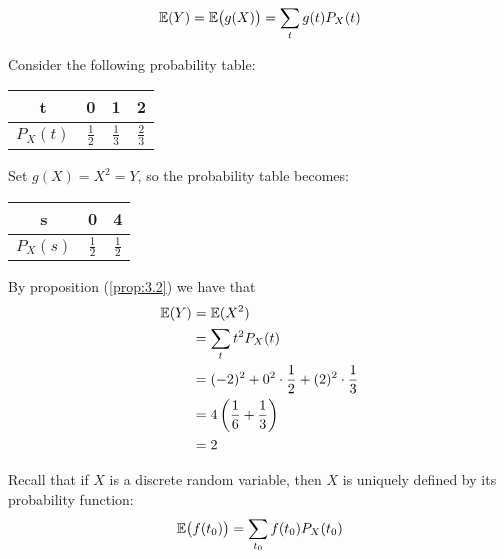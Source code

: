 \documentclass{article}
\begin{document}
	\begin{cor}
		$$ \mathbb{E}(Y) = \mathbb{E} \big( g(X) \big) = \sum_t g(t) P_X (t)$$
	\end{cor}
	\begin{exmp}
		Consider the following probability table:
		\begin{table}[h]
			\begin{tabular}{c|c|c|c}
				t & 0        & 1 & 2        \\ \hline
				$P_X(t)$ & $\frac12$ & $\frac13$ & $\frac23$
			\end{tabular}
		\end{table}
	\end{exmp}
	Set $g(X) = X^2 = Y$, so the probability table becomes:
	\begin{table}[h]
		\begin{tabular}{c|c|c}
			s & 0        & 4        \\ \hline
			$P_X(s)$ & $\frac12$ & $\frac12$
		\end{tabular}
	\end{table}
	By proposition (\ref{prop:3.2}) we have that
	\begin{align*}
		\mathbb{E}(Y) &= \mathbb{E}(X^2) \\
		&= \sum_t t^2 P_X (t) \\
		&= (-2)^2 + 0^2 \cdot \frac12 + (2)^2 \cdot \frac13 \\
		&= 4 \left( \frac16 + \frac13 \right) \\
		&= 2
	\end{align*}
	
	Recall that if $X$ is a discrete random variable, then $X$ is uniquely defined by its probability function:
	$$ \mathbb{E} \big( f(t_0) \big) = \sum_{t_0} f(t_0) P_X (t_0)$$
	
\end{document}
